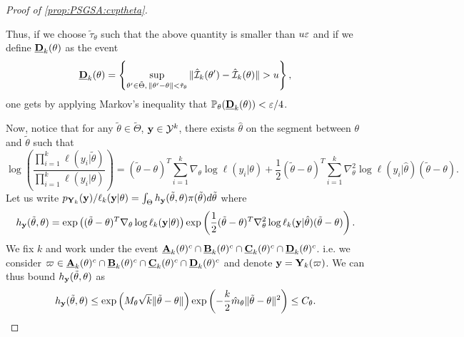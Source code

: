 \begin{proof}[Proof of \cref{prop:PSGSA:cvptheta}]
\begin{enumerate}
    
    Thus, {if we choose $\tilde\tau_\theta$ such that the above quantity is smaller than %
    $u\varepsilon$ and if we define $\underline{\mathbf{D}}_k(\theta)$ as the event}
    \begin{equation}
        \underline{\mbf D}_k(\theta)=\left\{\sup_{\theta'\in\tilde\Theta,\,\|\theta'-\theta\|<\tilde\tau_\theta}\|\hat\cI_k(\theta')-\hat\cI_k(\theta)\|>u \right\}, %
    \end{equation}
    one gets by applying Markov's inequality that $\mathbb{P}_\theta(\underline{\mathbf{D}}_k(\theta))<\varepsilon/4$.
    \end{enumerate}

    Now, notice that for any $\tilde\theta\in\tilde\Theta$, $\mathbf{y}\in\mathcal{Y}^k$, there exists $\hat\theta$ on the segment between $\theta$ and $\tilde\theta$ such that
    \begin{equation}\label{eq:DLlogfraclik}
        \log\left(\frac{\prod_{i=1}^k \ell(y_i|\tilde\theta)}{\prod_{i=1}^k \ell(y_i|\theta)}\right) = (\tilde\theta-\theta)^T\sum_{i=1}^k\nabla_\theta\log \ell(y_i|\theta) +\frac{1}{2}(\tilde\theta-\theta)^T\sum_{i=1}^k\nabla_\theta^2\log \ell(y_i|\hat\theta)(\tilde\theta-\theta).
    \end{equation}
    Let us write %
    $p_{\mathbf{Y}_k}(\mathbf{y})/\ell_k(\mathbf{y}|\theta) = \int_\Theta h_{\mathbf{y}}(\tilde\theta,\theta)\pi(\tilde\theta)d\tilde\theta$ where
    \begin{equation}\label{eq:hydef}
        h_{\mathbf{y}}(\tilde\theta,\theta) = \exp\left((\tilde\theta-\theta)^T\nabla_\theta\log\ell_k(\mathbf{y}|\theta)\right)  \exp \left( \frac{1}{2}(\tilde\theta-\theta)^T\nabla^2_\theta\log\ell_k(\mathbf{y}|\hat\theta)(\tilde\theta-\theta) \right).
    \end{equation}
    We fix $k$ and work under the event $\underline{\mathbf{A}}_k(\theta)^c\cap \underline{\mathbf{B}}_k(\theta)^c\cap \underline{\mathbf{C}}_k(\theta)^c\cap \underline{\mathbf{D}}_k(\theta)^c$. i.e. we %
    consider $\varpi\in \underline{\mathbf{A}}_k(\theta)^c\cap \underline{\mathbf{B}}_k(\theta)^c\cap \underline{\mathbf{C}}_k(\theta)^c\cap \underline{\mathbf{D}}_k(\theta)^c$ and denote $\mathbf{y} = \mathbf{Y}_k(\varpi)$.
    We can thus bound $h_{\mathbf{y}}(\tilde\theta,\theta)$  as
    \begin{equation}\label{eq:inegh}
        h_{\mathbf{y}}(\tilde\theta,\theta) \leq\exp\left( M_\theta\sqrt{k}\|\tilde\theta-\theta\| \right)\exp\left( -\frac{k}{2}\hat m_\theta\|\tilde\theta-\theta\|^2 \right)\leq C_\theta.
    \end{equation}
    

\end{proof}

